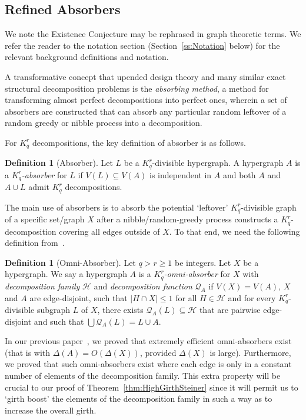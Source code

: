 \documentclass[11pt]{article}
\newcounter{i}
\theoremstyle{plain}
\theoremstyle{plain} %
\theoremstyle{definition}
\newtheorem{definition}[thm]{Definition}
\begin{document}
\subsection{Refined Absorbers}

We note the Existence Conjecture may be rephrased in graph theoretic terms. We refer the reader to the notation section (Section~\ref{ss:Notation} below) for the relevant background definitions and notation.

A transformative concept that upended design theory and many similar exact structural decomposition problems is the \emph{absorbing method}, a method for transforming almost perfect decompositions into perfect ones, wherein a set of absorbers are constructed that can absorb any particular random leftover of a random greedy or nibble process into a decomposition. 

For $K_q^r$ decompositions, the key definition of absorber is as follows.

\begin{definition}[Absorber]
Let $L$ be a $K_q^r$-divisible hypergraph. A hypergraph $A$ is a \emph{$K_q^r$-absorber} for $L$ if $V(L)\subseteq V(A)$ is independent in $A$ and both $A$ and $A\cup L$ admit $K_q^r$ decompositions.
\end{definition}

The main use of absorbers is to absorb the potential `leftover' $K_q^r$-divisible graph of a specific set/graph $X$ after a nibble/random-greedy process constructs a $K_q^r$-decomposition covering all edges outside of $X$. To that end, we need the following definition from~\cite{DPI}.

\begin{definition}[Omni-Absorber]
Let $q > r\ge 1$ be integers. Let $X$ be a hypergraph. We say a hypergraph $A$ is a \emph{$K_q^r$-omni-absorber} for $X$ with \emph{decomposition family} $\mathcal{H}$ and \emph{decomposition function} $\mathcal{Q}_A$ if $V(X)=V(A)$, $X$ and $A$ are edge-disjoint, such that $|H\cap X|\le 1$ for all $H\in\mathcal{H}$ and for every $K_q^r$-divisible subgraph $L$ of $X$, there exists $\mathcal{Q}_A(L)\subseteq \mathcal{H}$ that are pairwise edge-disjoint and such that $\bigcup \mathcal{Q}_A(L)=L\cup A$. 
\end{definition}

In our previous paper~\cite{DPI}, we proved that extremely efficient omni-absorbers exist (that is with $\Delta(A)=O(\Delta(X))$, provided $\Delta(X)$ is large). Furthermore, we proved that such omni-absorbers exist where each edge is only in a constant number of elements of the decomposition family. This extra property will be crucial to our proof of Theorem~\ref{thm:HighGirthSteiner} since it will permit us to `girth boost' the elements of the decomposition family in such a way as to increase the overall girth.
\end{document}
